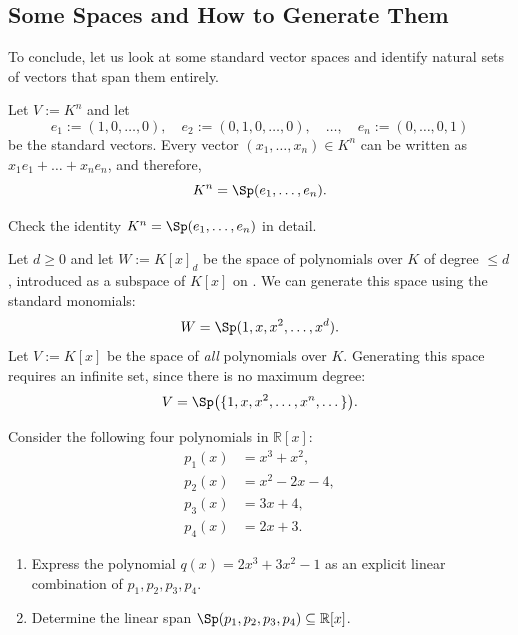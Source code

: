 \subsection{Some Spaces and How to Generate Them}

To conclude, let us look at some standard vector spaces and identify natural sets of  vectors that span them entirely.

\begin{example}
\label{ex:span_coordinate_space}
Let $V := K^n$ and let
\[
e_1 := (1, 0, \dots, 0), \quad e_2 := (0, 1, 0, \dots, 0), \quad \dots, \quad e_n := (0, \dots, 0, 1)
\]
be the standard vectors. Every vector $(x_1, \dots, x_n) \in K^n$ can be written as $x_1 e_1 + \dots + x_n e_n$, and therefore,
\[
K^n = \Sp(e_1, \dots, e_n).
\]
\end{example}

\begin{exercise}
\label{exc:check_standard_span}
Check the identity $K^n = \Sp(e_1, \dots, e_n)$ in detail.
\end{exercise}

\begin{example}[Polynomials]
\label{ex:span_polynomials}
Let $d \ge 0$ and let $W := K[x]_d$ be the space of polynomials over $K$ of degree $\le d$, introduced as a subspace of $K[x]$ on . We can generate this space using the standard monomials:
\[
W = \Sp(1, x, x^2, \dots, x^d).
\]
Let $V := K[x]$ be the space of \emph{all} polynomials over $K$. Generating this space requires an infinite set, since there is no maximum degree:
\[
V = \Sp\bigl(\{1, x, x^2, \dots, x^n, \dots\}\bigr).
\]
\end{example}

\begin{exercise}
\label{exc:polynomial_linear_combination_span}
Consider the following four polynomials in $\mathbb{R}[x]$:
\begin{align*}
p_1(x) &= x^3 + x^2, \\
p_2(x) &= x^2 - 2x - 4, \\
p_3(x) &= 3x + 4, \\
p_4(x) &= 2x + 3.
\end{align*}
\begin{enumerate}
    \item Express the polynomial $q(x) = 2x^3 + 3x^2 - 1$ as an explicit linear combination of $p_1, p_2, p_3, p_4$.
    \item Determine the linear span $\Sp(p_1, p_2, p_3, p_4) \subseteq \mathbb{R}[x]$.
\end{enumerate}
\end{exercise}

